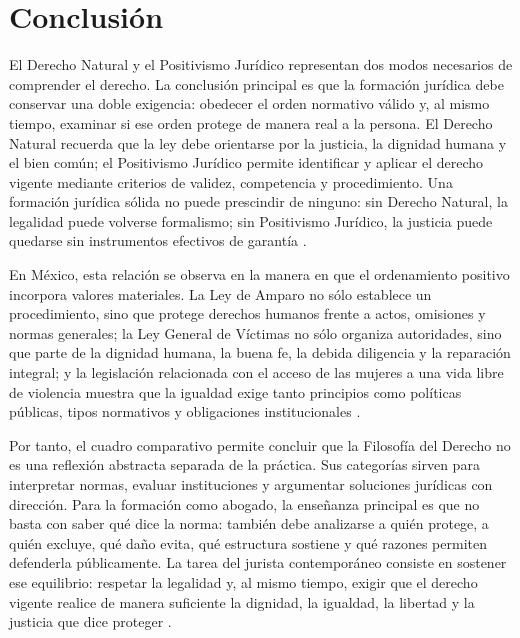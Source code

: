 \documentclass[
	spanish, %
	letterpaper, oneside
]{article}
\begin{document}
\section{Conclusión}

El Derecho Natural y el Positivismo Jurídico representan dos modos necesarios de comprender el derecho. La conclusión principal es que la formación jurídica debe conservar una doble exigencia: obedecer el orden normativo válido y, al mismo tiempo, examinar si ese orden protege de manera real a la persona. El Derecho Natural recuerda que la ley debe orientarse por la justicia, la dignidad humana y el bien común; el Positivismo Jurídico permite identificar y aplicar el derecho vigente mediante criterios de validez, competencia y procedimiento. Una formación jurídica sólida no puede prescindir de ninguno: sin Derecho Natural, la legalidad puede volverse formalismo; sin Positivismo Jurídico, la justicia puede quedarse sin instrumentos efectivos de garantía \citep{finnisEstudiosTeoriaDerecho2017}.

En México, esta relación se observa en la manera en que el ordenamiento positivo incorpora valores materiales. La Ley de Amparo no sólo establece un procedimiento, sino que protege derechos humanos frente a actos, omisiones y normas generales; la Ley General de Víctimas no sólo organiza autoridades, sino que parte de la dignidad humana, la buena fe, la debida diligencia y la reparación integral; y la legislación relacionada con el acceso de las mujeres a una vida libre de violencia muestra que la igualdad exige tanto principios como políticas públicas, tipos normativos y obligaciones institucionales \citep{LeyAmparoReglamentaria,LeyGeneralVictimas,franzoniacevedoLeyGeneralAcceso2017}.

Por tanto, el cuadro comparativo permite concluir que la Filosofía del Derecho no es una reflexión abstracta separada de la práctica. Sus categorías sirven para interpretar normas, evaluar instituciones y argumentar soluciones jurídicas con dirección. Para la formación como abogado, la enseñanza principal es que no basta con saber qué dice la norma: también debe analizarse a quién protege, a quién excluye, qué daño evita, qué estructura sostiene y qué razones permiten defenderla públicamente. La tarea del jurista contemporáneo consiste en sostener ese equilibrio: respetar la legalidad y, al mismo tiempo, exigir que el derecho vigente realice de manera suficiente la dignidad, la igualdad, la libertad y la justicia que dice proteger \citep{ruizrodriguezFilosofiaDerecho2009,lovonManualPracticoFilosofia2020}.



\end{document}
